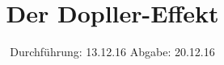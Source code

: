 

\subject{V104}
\title{Der Dopller-Effekt}
\date{
  Durchführung: 13.12.16
  \hspace{3em}
  Abgabe: 20.12.16
}



\maketitle
\thispagestyle{empty}
\tableofcontents
\newpage






\printbibliography


